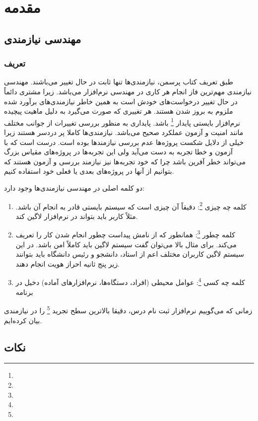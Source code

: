 \section{مقدمه}

\subsection{مهندسی نیازمندی}

\subsubsection{تعریف}

طبق تعریف کتاب پرسمن، نیازمندی‌ها تنها ثابت در حال تغییر می‌باشند. مهندسی
نیازمندی مهم‌ترین فاز انجام هر کاری در مهندسی نرم‌افزار می‌باشد. زیرا مشتری
دائماً در حال تغییر درخواست‌های خودش است به همین خاطر نیازمندی‌های برآورد شده
ملزوم به بروز شدن هستند. هر تغییری که صورت می‌گیرد به دلیل ماهیت پیچیده
نرم‌افزار بایستی پایدار \footnote{} باشد. پایداری به منظور بررسی
تغییرات از جوانب مختلف مانند امنیت و آزمون عملکرد صحیح می‌باشد. نیازمندی‌ها
کاملا پر دردسر هستند زیرا خیلی از دلایل شکست پروژه‌ها عدم بررسی نیازمند‌ها بوده
است. درست است که با آزمون و خطا تجربه به دست می‌آید ولی این تجربه‌ها در
پروژه‌های مقیاس بزرگ می‌تواند خطر آفرین باشد چرا که خود تجربه‌ها نیز نیازمند
بررسی و آزمون هستند که بتوانیم از آنها در پروژه‌های بعدی یا فعلی خود استفاده
کنیم.

دو کلمه اصلی در مهندسی نیازمندی‌ها وجود دارد:

\begin{enumerate}
  \item کلمه چه چیزی \footnote{}: دقیقاً‌ آن چیزی است که سیستم بایستی
  قادر به انجام آن باشد. مثلاً کاربر باید بتواند در نرم‌افزار لاگین کند.
  \item کلمه چطور \footnote{}: همانطور که از نامش پیداست چطور انجام شدن
  کار را تعریف می‌کند. برای مثال بالا می‌توان گفت سیستم لاگین باید کاملاً امن
  باشد. در این سیستم لاگین کاربران مختلف اعم از استاد، دانشجو و رئیس دانشگاه
  باید بتوانند زیر پنج ثانیه احراز هویت انجام دهند.
  \item کلمه چه کسی \footnote{}: عوامل محیطی (افراد، دستگاه‌ها،
  نرم‌افزار‌های آماده) دخیل در برنامه
\end{enumerate}

زمانی که می‌گوییم نرم‌افزار ثبت نام درس، دقیقا بالاترین سطح تجرید
\footnote{} را در نیازمندی بیان کرده‌ایم.

\subsection*{نکات}

